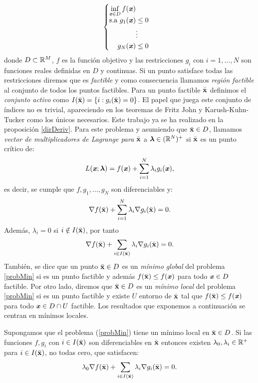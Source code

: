 		\begin{equation}\label{probMin}
		\begin{cases}
		\displaystyle\inf_{\textbf{\emph{x}}\in D} f(\textbf{\emph{x}})\\
		\begin{split}
		\text{s.a } g_1(\textbf{\emph{x}}) &\leq 0 \\
		&\vdots \\
		g_N(\textbf{\emph{x}}) &\leq 0
		\end{split}
		
		\end{cases} 
		\end{equation}
		donde $ D \subset \mathbb{R}^M$, $ f  $ es la función objetivo y las restricciones $ g_i $ con $ i =1,\dots, N $ son funciones reales definidas en $ D $ y continuas. Si un punto satisface todas las restricciones diremos que es \textit{factible}  y como consecuencia llamamos \textit{región factible} al conjunto de todos los puntos factibles. Para un punto factible $ \bar{\mathbf{x}} $ definimos el \textit{conjunto activo} como $ I(\bar{\mathbf{x}}) = \{i: g_i(\bar{\mathbf{x}}) = 0\}$. El papel que juega este conjunto de índices no es trivial, apareciendo en los teoremas de Fritz John y Karush-Kuhn-Tucker como los únicos necesarios. Este trabajo ya se ha realizado en la proposición \ref{dirDeriv}. Para este problema y asumiendo que $ \bar{\mathbf{x}} \in D $, llamamos \textit{vector de multiplicadores de Lagrange para $ \bar{\mathbf{x}} $} a $ \boldsymbol{\mathbf{\lambda}} \in (\mathbb{R}^N)^+ $ si $ \bar{\mathbf{x}} $ es un punto crítico de:
		\[
		L(\textbf{\emph{x}};\boldsymbol{\mathbf{\lambda}}) = f(\textbf{\emph{x}}) + \sum_{i=1}^{N} \lambda_i g_i(\textbf{\emph{x}}),
		\]
		es decir, se cumple que $ f,g_1,\dots,g_N $ son diferenciables y:
		\[
		\nabla f(\bar{\mathbf{x}}) + \sum_{i=1}^{N} \lambda_i \nabla g_i(\bar{\mathbf{x}}) = 0.
		\]
		Además, $ \lambda_i = 0 $ si $ i \notin I(\bar{\mathbf{x}}) $, por tanto
		\[
		\nabla f(\bar{\mathbf{x}}) + \sum_{i \in I(\bar{\mathbf{x}})} \lambda_i \nabla g_i(\bar{\mathbf{x}}) = 0.
		\] 
		También, se dice que un punto $ \bar{\mathbf{x}} \in D $ es un \textit{mínimo global} del problema \ref{probMin} si es un punto factible y además $ f(\bar{\mathbf{x}}) \leq f(\textbf{\emph{x}}) $ para todo $ \textbf{\emph{x}} \in D $ factible. Por otro lado, diremos que $ \bar{\mathbf{x}} \in D $ es un \textit{mínimo local} del problema \ref{probMin} si es un punto factible y existe $ U $ entorno de $ \bar{\mathbf{x}} $ tal que $ f(\bar{\mathbf{x}}) \leq f(\textbf{\emph{x}}) $ para todo $ \textbf{\emph{x}} \in D\cap U $ factible. Los resultados que exponemos a continuación se centran en mínimos locales.
		\bigskip
		\begin{teoremaBox}\label{FritzJohn}
			Supongamos que el problema (\ref{probMin}) tiene un mínimo local en $ \bar{\mathbf{x}} \in D $. Si las funciones $ f, g_i $ con $ i \in I(\bar{\mathbf{x}}) $ son diferenciables en $ \bar{\mathbf{x}} $ entonces existen $ \lambda_0, \lambda_i \in \mathbb{R}^+ $ para $ i \in I(\bar{\mathbf{x}}) $, no todas cero, que satisfacen:
			\[
			\lambda_0 \nabla f(\bar{\mathbf{x}}) + \sum_{i \in I(\bar{\mathbf{x}})} \lambda_i \nabla g_i(\bar{\mathbf{x}}) = 0.
			\]
		\end{teoremaBox}
